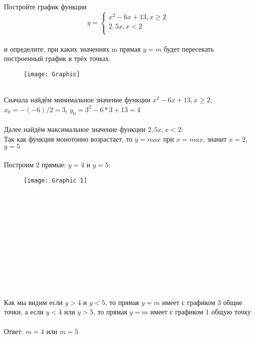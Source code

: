 \documentclass{article}
\begin{document}
	Постройте график функции\\
	\begin{equation*}
		y = 
		\left\{
			\begin{array}{ccc}
				x^2-6x+13, x \geq 2 \\
				2,5x, x < 2\\
			\end{array}
		\right.
	\end{equation*}
	\\
	и определите, при каких значениях m прямая {$y=m$}   будет пересекать построенный график в трёх точках.\\
	\begin{figure}[h]
		\begin{center}
			\texttt{[image: Graphic]}
		\end{center}
	\end{figure}
	\\
	Сначала найдём минимальное значение функции $x^2-6x+13, x \geq 2$:\\
	$x_{0} = -(-6)/2 = 3$, $y_{0} = 3^2-6*3+13=4$\\
	\\
	Далее найдём максимальное значение функции $2,5x, x < 2$:\\
	Так как функция монотонно возрастает, то $y = max$ при $x = max$, значит $x=2$, $y=5$\\
	\\
	Построим 2 прямые: $y = 4$ и $y = 5$:\\
	\begin{figure}[h]
		\begin{center}
			\texttt{[image: Graphic 1]}
		\end{center}
	\end{figure}
	\\
	\\
	\\
	\\
	\\
	\\
	\\
	\\
	\\
	\\
	\\
	Как мы видим если $y>4$ и $y<5$, то прямая $y = m$  имеет с графиком 3 общие точки, а если $y<4$ или $y>5$, то прямая $y = m$  имеет с графиком 1 общую точку\\
	\\
	Ответ: $m = 4$ или $m=5$
\end{document}
